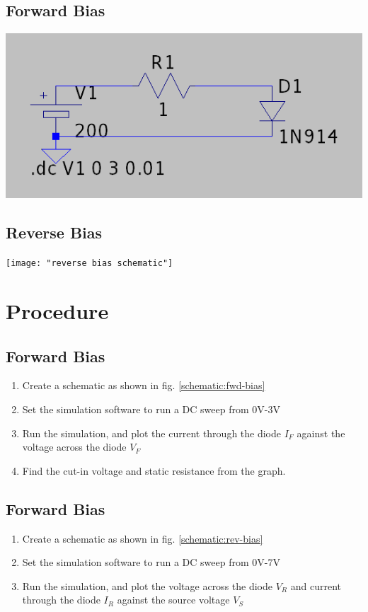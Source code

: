 \documentclass{article}
\begin{document}
	\subsection{Forward Bias}
		\begin{center}
			\label{schematic:fwd-bias}
			\includegraphics[width=0.7\linewidth]{"forward bias schematic"}
		\end{center}		
	\subsection{Reverse Bias}
		\begin{center}
			\label{schematic:rev-bias}
			\texttt{[image: "reverse bias 	schematic"]}
		\end{center}		
	\section{Procedure}
	\subsection{Forward Bias}
	\begin{enumerate}
		\item Create a schematic as shown in fig. \ref{schematic:fwd-bias}
		\item Set the simulation software to run a DC sweep from 0V-3V
		\item Run the simulation, and plot the current through the diode $ I_F $ against the voltage across the diode $ V_F $
		\item Find the cut-in voltage and static resistance from the graph.
	\end{enumerate}
	\subsection{Forward Bias}
	\begin{enumerate}
		\item Create a schematic as shown in fig. \ref{schematic:rev-bias}
		\item Set the simulation software to run a DC sweep from 0V-7V
		\item Run the simulation, and plot the voltage across the diode $ V_R $ and current through the diode $ I_R $ against the source voltage $ V_S $
	\end{enumerate}
\end{document}

